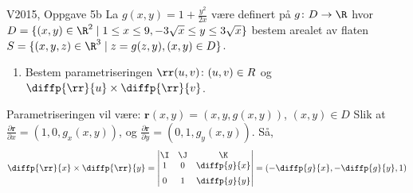 \begin{frame}
  \begin{oppgave}{V2015, Oppgave 5b}
    La $g(x,y) = 1+\frac{y^2}{2x}$ være definert på $g\colon D \to \R$ hvor
    $D = \{(x,y) \in \R^2 \mid 1 \leq x \leq 9, -3 \sqrt{x} \leq y \leq 3 \sqrt{x}\}$
    bestem arealet av flaten $S = \{(x,y,z)\in \R^3 \mid z = g(z,y), (x,y) \in D\}$.
  \end{oppgave}
  \begin{enumerate}
    \item Bestem parametriseringen $\rr(u,v) \colon (u,v) \in R$ og
      $
      \diffp{\rr}{u}\times\diffp{\rr}{v}
      $.
  \end{enumerate}
      Parametriseringen vil være: $\mathbf{r}(x, y)=(x, y, g(x,y))$, $(x,y)\in D$  Slik at $\frac{\partial
        \mathbf{r}}{\partial x}=(1, 0, g_x(x,y))$, og $\frac{\partial
        \mathbf{r}}{\partial y}=(0, 1, g_y(x,y))$.  Så,
      \begin{equation}
        \diffp{\rr}{x}\times\diffp{\rr}{y}
        = \begin{vmatrix}
          \I & \J & \K \\
          1 & 0 & \diffp{g}{x} \\[0.2cm]
          0 & 1 & \diffp{g}{y}
        \end{vmatrix}
        = \left( -\diffp{g}{x}, -\diffp{g}{y}, 1 \right)
      \end{equation}
  \end{frame}

